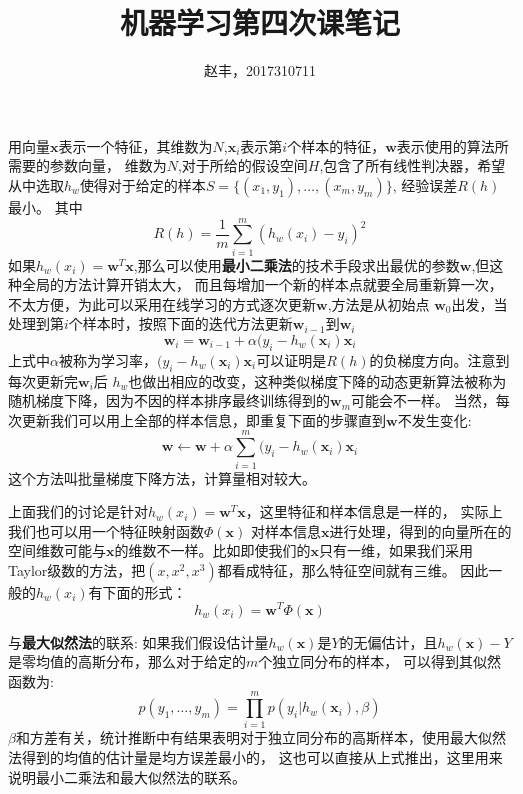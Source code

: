 \documentclass{article}
\begin{document}
\title{机器学习第四次课笔记}
\author{赵丰，2017310711}
\maketitle
用向量$\bm{x}$表示一个特征，其维数为$N$,$\bm{x}_i$表示第$i$个样本的特征，$\bm{w}$表示使用的算法所需要的参数向量，
维数为$N$,对于所给的假设空间$H$,包含了所有线性判决器，希望从中选取$h_w$使得对于给定的样本$S=\{(x_1,y_1),\dots,(x_m,y_m)\}$,
经验误差$R(h)$最小。
其中
\begin{equation}
R(h)=\frac{1}{m}\sum_{i=1}^m (h_w(x_i)-y_i)^2
\end{equation}
如果$h_w(x_i)=\bm{w}^T\bm{x}$,那么可以使用\textbf{最小二乘法}的技术手段求出最优的参数$\bm{w}$,但这种全局的方法计算开销太大，
而且每增加一个新的样本点就要全局重新算一次，不太方便，为此可以采用在线学习的方式逐次更新$\bm{w}$,方法是从初始点
$\bm{w}_0$出发，当处理到第$i$个样本时，按照下面的迭代方法更新$\bm{w}_{i-1}$到$\bm{w}_i$
\begin{equation}
\bm{w}_i=\bm{w}_{i-1}+\alpha (y_i-h_w(\bm{x}_i)\bm{x}_i
\end{equation}
上式中$\alpha$被称为学习率，$(y_i-h_w(\bm{x}_i)\bm{x}_i$可以证明是$R(h)$的负梯度方向。注意到每次更新完$\bm{w}_i$后
$h_w$也做出相应的改变，这种类似梯度下降的动态更新算法被称为随机梯度下降，因为不因的样本排序最终训练得到的$\bm{w}_m$可能会不一样。
当然，每次更新我们可以用上全部的样本信息，即重复下面的步骤直到$\bm{w}$不发生变化:
\begin{equation}
\bm{w} \leftarrow \bm{w}+\alpha\sum_{i=1}^m (y_i-h_w(\bm{x}_i)\bm{x}_i
\end{equation}
这个方法叫批量梯度下降方法，计算量相对较大。

上面我们的讨论是针对$h_w(x_i)=\bm{w}^T\bm{x}$，这里特征和样本信息是一样的， 实际上我们也可以用一个特征映射函数$\Phi(\bm{x})$
对样本信息$\bm{x}$进行处理，得到的向量所在的空间维数可能与$\bm{x}$的维数不一样。比如即使我们的$\bm{x}$只有一维，如果我们采用
Taylor级数的方法，把$(x,x^2,x^3)$都看成特征，那么特征空间就有三维。
因此一般的$h_w(x_i)$有下面的形式：
\begin{equation}
h_w(x_i)=\bm{w}^T\Phi(\bm{x})
\end{equation}

与\textbf{最大似然法}的联系:
如果我们假设估计量$h_w(\bm{x})$是$Y$的无偏估计，且$h_w(\bm{x})-Y$ 是零均值的高斯分布，那么对于给定的$m$个独立同分布的样本，
可以得到其似然函数为:
\begin{equation}
p(y_1,\dots,y_m)=\prod_{i=1}^m p(y_i| h_w(\bm{x}_i),\beta)
\end{equation}
$\beta$和方差有关，统计推断中有结果表明对于独立同分布的高斯样本，使用最大似然法得到的均值的估计量是均方误差最小的，
这也可以直接从上式推出，这里用来说明最小二乘法和最大似然法的联系。
\end{document}
